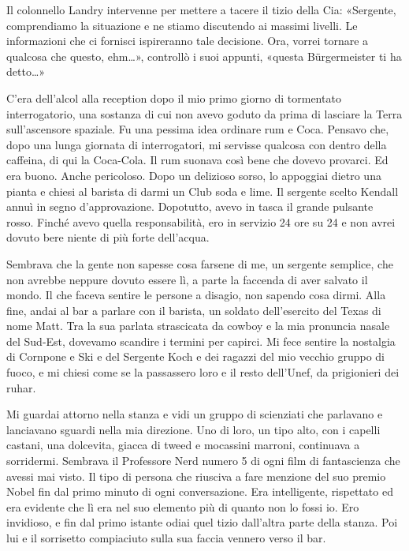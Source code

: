 Il colonnello Landry intervenne per mettere a tacere il tizio della Cia:
«Sergente, comprendiamo la situazione e ne stiamo discutendo ai massimi
livelli. Le informazioni che ci fornisci ispireranno tale decisione.
Ora, vorrei tornare a qualcosa che questo, ehm\ldots», controllò i suoi
appunti, «questa Bürgermeister ti ha detto\ldots»

\hfill\break

C'era dell'alcol alla reception dopo il mio primo giorno di tormentato
interrogatorio, una sostanza di cui non avevo goduto da prima di
lasciare la Terra sull'ascensore spaziale. Fu una pessima idea ordinare
rum e Coca. Pensavo che, dopo una lunga giornata di interrogatori, mi
servisse qualcosa con dentro della caffeina, di qui la Coca-Cola. Il rum
suonava così bene che dovevo provarci. Ed era buono. Anche pericoloso.
Dopo un delizioso sorso, lo appoggiai dietro una pianta e chiesi al
barista di darmi un Club soda e lime. Il sergente scelto Kendall annuì
in segno d'approvazione. Dopotutto, avevo in tasca il grande pulsante
rosso. Finché avevo quella responsabilità, ero in servizio 24 ore su 24
e non avrei dovuto bere niente di più forte dell'acqua.

Sembrava che la gente non sapesse cosa farsene di me, un sergente
semplice, che non avrebbe neppure dovuto essere lì, a parte la faccenda
di aver salvato il mondo. Il che faceva sentire le persone a disagio,
non sapendo cosa dirmi. Alla fine, andai al bar a parlare con il
barista, un soldato dell'esercito del Texas di nome Matt. Tra la sua
parlata strascicata da cowboy e la mia pronuncia nasale del Sud-Est,
dovevamo scandire i termini per capirci. Mi fece sentire la nostalgia di
Cornpone e Ski e del Sergente Koch e dei ragazzi del mio vecchio gruppo
di fuoco, e mi chiesi come se la passassero loro e il resto dell'Unef,
da prigionieri dei ruhar.

Mi guardai attorno nella stanza e vidi un gruppo di scienziati che
parlavano e lanciavano sguardi nella mia direzione. Uno di loro, un tipo
alto, con i capelli castani, una dolcevita, giacca di tweed e mocassini
marroni, continuava a sorridermi. Sembrava il Professore Nerd numero 5
di ogni film di fantascienza che avessi mai visto. Il tipo di persona
che riusciva a fare menzione del suo premio Nobel fin dal primo minuto
di ogni conversazione. Era intelligente, rispettato ed era evidente che
lì era nel suo elemento più di quanto non lo fossi io. Ero invidioso, e
fin dal primo istante odiai quel tizio dall'altra parte della stanza.
Poi lui e il sorrisetto compiaciuto sulla sua faccia vennero verso il
bar.

